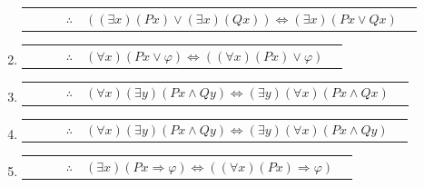 \documentclass[12pt]{report}
\theoremstyle{largebreak}
\newcounter{tablec}
\begin{document}
\begin{excer}
\begin{enumerate}[label=($\alph*$)]
\begin{center}
\begin{tabular}{l r l c l r}
                    \hline
                    & & & $\therefore$ & $((\exists x)(Px)\lor(\exists x)(Qx))\iff(\exists x)(Px\lor Qx)$ & \\
                \end{tabular}
            \end{center}
            \item \begin{center}
                \setcounter{tablec}{1}
                \begin{tabular}{l r l c l r}
                    \hline
                    & & & $\therefore$ & $(\forall x)(Px\lor\varphi)\iff((\forall x)(Px)\lor\varphi)$ & \\
                \end{tabular}
            \end{center}
            \item \begin{center}
                \setcounter{tablec}{1}
                \begin{tabular}{l r l c l r}
                    \hline
                    & & & $\therefore$ & $(\forall x)(\exists y)(Px\land Qy)\iff(\exists y)(\forall x)(Px\land Qx)$ & \\
                \end{tabular}
            \end{center}
            \item \begin{center}
                \setcounter{tablec}{1}
                \begin{tabular}{l r l c l r}
                    \hline
                    & & & $\therefore$ & $(\forall x)(\exists y)(Px\land Qy)\iff(\exists y)(\forall x)(Px\land Qy)$ & \\
                \end{tabular}
            \end{center}
            \item \begin{center}
                \setcounter{tablec}{1}
                \begin{tabular}{l r l c l r}
                    \hline
                    & & & $\therefore$ & $(\exists x)(Px\Rightarrow\varphi)\iff((\forall x)(Px)\Rightarrow\varphi)$ & \\
                \end{tabular}
            \end{center}
        \end{enumerate}
    \end{excer}
\end{document}
